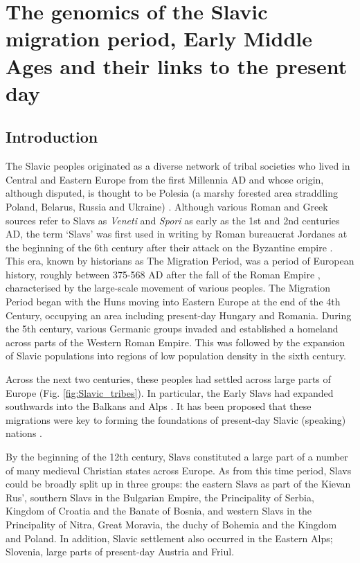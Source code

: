 \chapter{The genomics of the Slavic migration period, Early Middle Ages and their links to the present day}
\label{chapterlabel5}

\section{Introduction}

The Slavic peoples originated as a diverse network of tribal societies who lived in Central and Eastern Europe from the first Millennia AD \cite{barford2001early} and whose origin, although disputed, is thought to be Polesia (a marshy forested area straddling Poland, Belarus, Russia and Ukraine) \cite{fouracre1995new}. Although various Roman and Greek sources refer to Slavs as \textit{Veneti} and \textit{Spori} as early as the 1st and 2nd centuries AD, the term `Slavs' was first used in writing by Roman bureaucrat Jordanes at the beginning of the 6th century after their attack on the Byzantine empire \cite{curta2006southeastern}. This era, known by historians as The Migration Period, was a period of European history, roughly between 375-568 AD after the fall of the Roman Empire \cite{halsall2007barbarian}, characterised by the large-scale movement of various peoples. The Migration Period began with the Huns moving into Eastern Europe at the end of the 4th Century, occupying an area including present-day Hungary and Romania. During the 5th century, various Germanic groups invaded and established a homeland across parts of the Western Roman Empire. This was followed by the expansion of Slavic populations into regions of low population density in the sixth century.

Across the next two centuries, these peoples had settled across large parts of Europe (Fig. \ref{fig:Slavic_tribes}). In particular, the Early Slavs had expanded southwards into the Balkans and Alps \cite{barford2001early, brather2008archaologie, geary2003myth,gojda1991ancient}. It has been proposed that these migrations were key to forming the foundations of present-day Slavic (speaking) nations \cite{barford2001early}.  

By the beginning of the 12th century, Slavs constituted a large part of a number of many medieval Christian states across Europe. As from this time period, Slavs could be broadly split up in three groups: the eastern Slavs as part of the Kievan Rus', southern Slavs in the Bulgarian Empire, the Principality of Serbia, Kingdom of Croatia and the Banate of Bosnia, and western Slavs in the Principality of Nitra, Great Moravia, the duchy of Bohemia and the Kingdom and Poland. In addition, Slavic settlement also occurred in the Eastern Alps; Slovenia, large parts of present-day Austria and Friul. 

